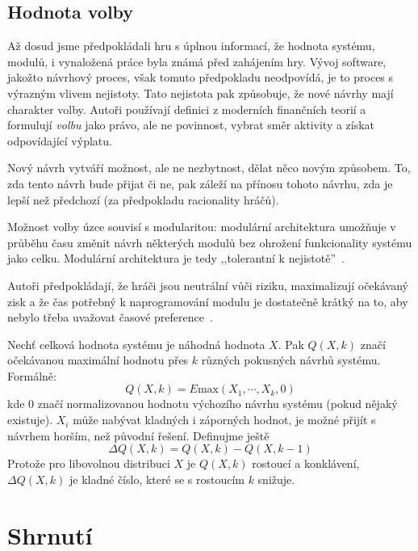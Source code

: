 \begin{multicols}{2}
	\subsection*{Hodnota volby}
		Až dosud jsme předpokládali hru s úplnou informací, že hodnota systému, modulů, i vynaložená práce byla známá před zahájením hry. Vývoj software, jakožto návrhový proces, však tomuto předpokladu neodpovídá, je to proces s výrazným vlivem nejistoty. Tato nejistota pak způsobuje, že nové návrhy mají charakter volby. Autoři používají definici z moderních finančních teorií a formulují {\em volbu} jako právo, ale ne povinnost, vybrat směr aktivity a získat odpovídající výplatu.

		Nový návrh vytváří možnost, ale ne nezbytnost, dělat něco novým způsobem. To, zda tento návrh bude přijat či ne, pak záleží na přínosu tohoto návrhu, zda je lepší než předchozí (za předpokladu racionality hráčů).

		Možnost volby úzce souvisí s modularitou: modulární architektura umožňuje v průběhu času změnit návrh některých modulů bez ohrožení funkcionality systému jako celku. Modulární architektura je tedy ,,tolerantní k nejistotě''~\cite[kap. 2.2]{architecture-opensource}.

		Autoři předpokládají, že hráči jsou neutrální vůči riziku, maximalizují očekávaný zisk a že čas potřebný k naprogramování modulu je dostatečně krátký na to, aby nebylo třeba uvažovat časové preference~\cite[kap. 5]{architecture-opensource}.

		Nechť celková hodnota systému je náhodná hodnota $X$. Pak $Q(X, k)$ značí očekávanou maximální hodnotu přes $k$ různých pokusných návrhů systému. Formálně:
		$$Q(X, k) = E\text{max}(X_1, \cdots, X_k, 0)$$
		kde $0$ značí normalizovanou hodnotu výchozího návrhu systému (pokud nějaký existuje). $X_i$ může nabývat kladných i záporných hodnot, je možné přijít s návrhem horším, než původní řešení. Definujme ještě
		$$\Delta Q(X, k) = Q(X,k) - Q(X, k-1)$$
		Protože pro libovolnou distribuci $X$ je $Q(X,k)$ rostoucí a konklávení, $\Delta Q(X,k)$ je kladné číslo, které se s rostoucím $k$ snižuje.




\section{Shrnutí}








%

\end{multicols}
